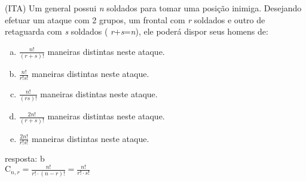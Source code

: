 \begin{ex}
 (ITA) Um general possui \textit{n} soldados para tomar uma posição inimiga. Desejando efetuar um ataque com 2 grupos, um frontal com \textit{r} soldados e outro de retaguarda com \textit{s}  soldados ( \textit{r}+\textit{s}=\textit{n}), ele poderá dispor seus homens de:
    \begin{enumerate}[(a)]
    \item $\frac{n!}{(r+s)!}$ maneiras distintas neste ataque.
    \item $\frac{n!}{r!s!}$ maneiras distintas neste ataque.
    \item $\frac{n!}{(rs)!}$ maneiras distintas neste ataque.
    \item $\frac{2n!}{(r+s)!}$ maneiras distintas neste ataque.
    \item $\frac{2n!}{r!s!}$ maneiras distintas neste ataque.
    \end{enumerate}
      \begin{sol}
       resposta: b \\
       $\mathrm{C}_{n,r}=\frac{n!}{r!\cdot(n-r)!}=\frac{n!}{r!\cdot s!}$
      \end{sol}
\end{ex}